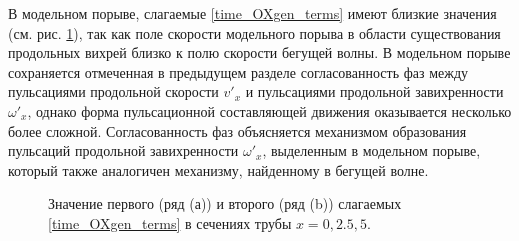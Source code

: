 В модельном порыве, слагаемые \eqref{time_OXgen_terms} имеют близкие значения (см. рис. \ref{OXgen_terms_cmp_pic}), так как поле скорости модельного порыва в области существования продольных вихрей близко к полю скорости бегущей волны. В модельном порыве сохраняется отмеченная в предыдущем разделе согласованность фаз между пульсациями продольной скорости $v'_x$ и пульсациями продольной завихренности $\omega'_x$, однако форма пульсационной составляющей движения оказывается несколько более сложной. Согласованность фаз объясняется механизмом образования пульсаций продольной завихренности $\omega'_x$, выделенным в модельном порыве, который также аналогичен механизму, найденному в бегущей волне. 


\begin{figure}[h]
\caption{Значение первого (ряд (а)) и второго (ряд (b)) слагаемых \eqref{time_OXgen_terms} в сечениях трубы $x=0,2.5,5$. }
\label{OXgen_terms_cmp_pic}
\end{figure}


